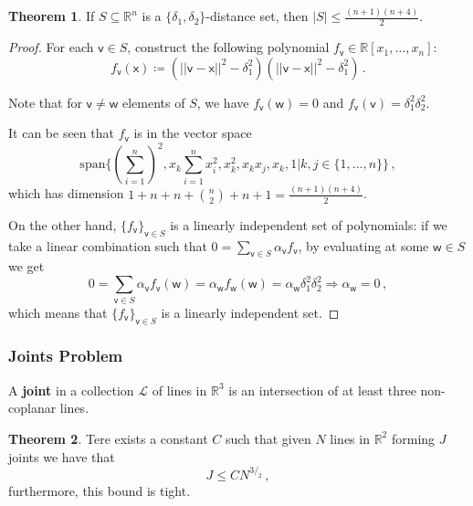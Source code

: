 \documentclass[12pt]{amsart}
\theoremstyle{definition}
\newtheorem{thm}{Theorem}[section]
\newcommand{\R}{\mathbb{R}}
\newcommand{\vv}{\mathsf{v}}
\newcommand{\vw}{\mathsf{w}}
\newcommand{\vx}{\mathsf{x}}
\newcommand{\spn}{\mathrm{span}}
\begin{document}
\begin{thm}
If $S\subseteq \R^n$ is a $\{\delta_1, \delta_2 \}$-distance set, then $|S| \leq \frac{(n+1)(n+4)}{2}$.
\end{thm}

\begin{proof}
For each $\vv \in S$, construct the following polynomial $f_{\vv} \in \R[x_1, \ldots, x_n]$:
$$f_{\vv} (\vx) \coloneqq \left(||\vv - \vx||^2 - \delta_1^2\right)\left(||\vv - \vx||^2 - \delta_1^2\right) \, . $$

Note that for $\vv \neq \vw $ elements of $S$, we have $f_{\vv} (\vw) = 0$ and $f_{\vv}(\vv) = \delta_1^2\delta_2^2$.

It can be seen that $f_{\vv}$ is in the vector space
$$\spn \{\left(\sum_{i=1}^n\right)^2, x_k \sum_{i=1}^n x_i^2, x_k^2, x_kx_j, x_k, 1 | k, j \in \{1, \ldots, n\} \}\, ,$$
which has dimension $1 + n + n + \binom{n}{2} + n + 1 = \frac{(n+1)(n+4)}{2}$.

On the other hand, $\{f_{\vv}\}_{\vv \in S}$ is a linearly independent set of polynomials: if we take a linear combination such that $0 = \sum_{\vv \in S} \alpha_{\vv} f_{\vv}$, by evaluating at some $\vw \in S$ we get
$$ 0 = \sum_{\vv \in S} \alpha_{\vv} f_{\vv}(\vw) = \alpha_{\vw} f_{\vw}(\vw) = \alpha_{
\vw} \delta_1^2 \delta_2^2 \Rightarrow \alpha_{\vw} = 0 \, ,$$
which means that $\{f_{\vv}\}_{\vv \in S}$ is a linearly independent set.
\end{proof}



\subsubsection*{Joints Problem}


A \textbf{joint} in a collection $\mathcal L$ of lines in $\R^3$ is an intersection of at least three non-coplanar lines.


\begin{thm}\label{thm:joints}
Tere exists a constant $C$ such that given $N$ lines in $\R^2$ forming $J$ joints we have that
$$ J \leq C N^{3/_2}\, ,$$
furthermore, this bound is tight.
\end{thm}
\end{document}
